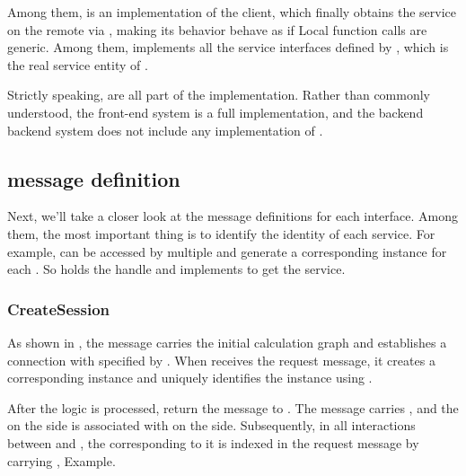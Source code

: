 \begin{content}
Among them,  is an implementation of the  client, which finally obtains the  service on the remote  via , making its behavior behave as if Local function calls are generic. Among them,  implements all the service interfaces defined by , which is the real service entity of .

\begin{remark}
Strictly speaking,  are all part of the  implementation. Rather than commonly understood, the  front-end system is a full  implementation, and the backend  backend system does not include any implementation of .
\end{remark}

\subsection{message definition}

Next, we'll take a closer look at the message definitions for each interface. Among them, the most important thing is to identify the identity of each service. For example,  can be accessed by multiple  and generate a corresponding  instance for each . So  holds the  handle and implements  to get the  service.

\subsubsection{CreateSession}

As shown in , the  message carries the initial calculation graph and establishes a connection with  specified by . When  receives the request message, it creates a corresponding  instance and uniquely identifies the  instance using .

After the  logic is processed, return the message  to . The  message carries , and the  on the  side is associated with  on the  side. Subsequently, in all interactions between  and , the  corresponding to it is indexed in the request message by carrying ,  Example.


\end{content}
